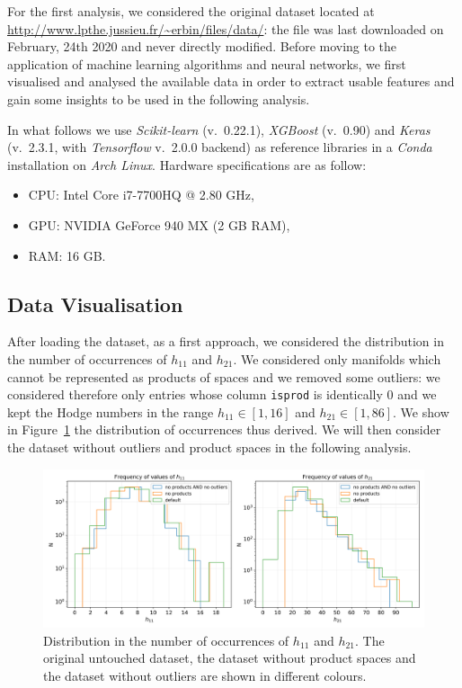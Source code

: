 For the first analysis, we considered the original dataset located at \url{http://www.lpthe.jussieu.fr/~erbin/files/data/}: the file was last downloaded on February, 24th 2020 and never directly modified. Before moving to the application of machine learning algorithms and neural networks, we first visualised and analysed the available data in order to extract usable features and gain some insights to be used in the following analysis.

In what follows we use \textit{Scikit-learn} (v.\ 0.22.1), \textit{XGBoost} (v.\ 0.90) and \textit{Keras} (v.\ 2.3.1, with \textit{Tensorflow} v.\ 2.0.0 backend) as reference libraries in a \textit{Conda} installation on \textit{Arch Linux}. Hardware specifications are as follow:
\begin{itemize}
    \item CPU: Intel Core i7-7700HQ @ 2.80 GHz,
    \item GPU: NVIDIA GeForce 940 MX (2 GB RAM),
    \item RAM: 16 GB.
\end{itemize}

\subsection{Data Visualisation}

    After loading the dataset, as a first approach, we considered the distribution in the number of occurrences of $h_{11}$ and $h_{21}$. We considered only manifolds which cannot be represented as products of spaces and we removed some outliers: we considered therefore only entries whose column \texttt{isprod} is identically $0$ and we kept the Hodge numbers in the range $h_{11} \in \left[ 1, 16 \right]$ and $h_{21} \in \left[1, 86 \right]$. We show in Figure~\ref{fig:distribution_occurrences} the distribution of occurrences thus derived. We will then consider the dataset without outliers and product spaces in the following analysis.
    
    \begin{figure}[!t]
        \centering
        \includegraphics[width=\textwidth]{tex/img/h11_h21_occurrencies.png}
        \caption{Distribution in the number of occurrences of $h_{11}$ and $h_{21}$. The original untouched dataset, the dataset without product spaces and the dataset without outliers are shown in different colours.}
        \label{fig:distribution_occurrences}
    \end{figure}
    
